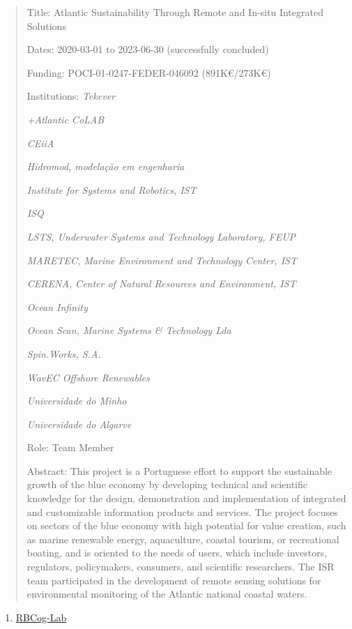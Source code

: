 \documentclass[
]{article}
\begin{document}
\begin{quote}
Title: Atlantic Sustainability Through Remote and In-situ Integrated
Solutions

Dates: 2020-03-01 to 2023-06-30 (successfully concluded)

Funding: POCI-01-0247-FEDER-046092 (891K€/273K€)

Institutions: \emph{Tekever}

\emph{+Atlantic CoLAB}

\emph{CEiiA}

\emph{Hidromod, modelação em engenharia}

\emph{Institute for Systems and Robotics, IST}

\emph{ISQ}

\emph{LSTS, Underwater Systems and Technology Laboratory, FEUP}

\emph{MARETEC, Marine Environment and Technology Center, IST}

\emph{CERENA, Center of Natural Resources and Environment, IST}

\emph{Ocean Infinity}

\emph{Ocean Scan, Marine Systems \& Technology Lda}

\emph{Spin.Works, S.A.}

\emph{WavEC Offshore Renewables}

\emph{Universidade do Minho}

\emph{Universidade do Algarve}

Role: Team Member

Abstract: This project is a Portuguese effort to support the sustainable
growth of the blue economy by developing technical and scientific
knowledge for the design, demonstration and implementation of integrated
and customizable information products and services. The project focuses
on sectors of the blue economy with high potential for value creation,
such as marine renewable energy, aquaculture, coastal tourism, or
recreational boating, and is oriented to the needs of users, which
include investors, regulators, policymakers, consumers, and scientific
researchers. The ISR team participated in the development of remote
sensing solutions for environmental monitoring of the Atlantic national
coastal waters.
\end{quote}

\begin{enumerate}
\def\labelenumi{\arabic{enumi}.}
\setcounter{enumi}{4}
\item
  \ul{RBCog-Lab}
\end{enumerate}
\end{document}
